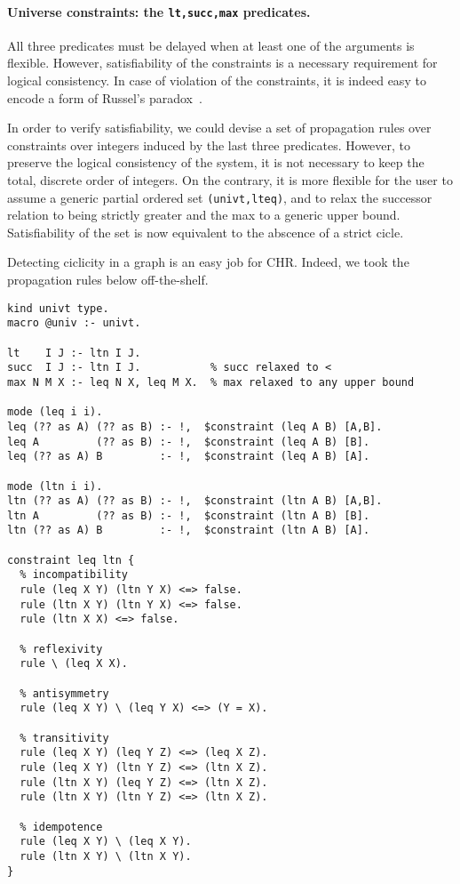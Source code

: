 \documentclass{easychair}
\begin{document}
\paragraph{Universe constraints: the \texttt{lt,succ,max} predicates.}
All three predicates must be delayed when at least one of the arguments is flexible. However, satisfiability of the constraints is a necessary requirement for logical consistency. In case of violation of the constraints, it is indeed easy to encode a form of Russel's paradox~\cite{???}.

In order to verify satisfiability, we could devise a set of propagation rules
over constraints over integers induced by the last three predicates. However, to preserve the logical consistency of the system, it is not necessary to keep the total, discrete order of integers. On the contrary, it is more flexible for the user to assume a generic partial ordered set \verb+(univt,lteq)+, and to relax the successor relation to being strictly greater and the max to a generic upper bound. Satisfiability of the set is now equivalent to the abscence of a strict cicle.

Detecting ciclicity in a graph is an easy job for CHR. Indeed, we took the propagation rules below off-the-shelf.

\begin{verbatim}
kind univt type.
macro @univ :- univt.

lt    I J :- ltn I J.
succ  I J :- ltn I J.           % succ relaxed to <
max N M X :- leq N X, leq M X.  % max relaxed to any upper bound

mode (leq i i).
leq (?? as A) (?? as B) :- !,  $constraint (leq A B) [A,B].
leq A         (?? as B) :- !,  $constraint (leq A B) [B].
leq (?? as A) B         :- !,  $constraint (leq A B) [A].

mode (ltn i i).
ltn (?? as A) (?? as B) :- !,  $constraint (ltn A B) [A,B].
ltn A         (?? as B) :- !,  $constraint (ltn A B) [B].
ltn (?? as A) B         :- !,  $constraint (ltn A B) [A].

constraint leq ltn {
  % incompatibility
  rule (leq X Y) (ltn Y X) <=> false.
  rule (ltn X Y) (ltn Y X) <=> false.
  rule (ltn X X) <=> false.
  
  % reflexivity
  rule \ (leq X X).

  % antisymmetry
  rule (leq X Y) \ (leq Y X) <=> (Y = X).

  % transitivity
  rule (leq X Y) (leq Y Z) <=> (leq X Z).
  rule (leq X Y) (ltn Y Z) <=> (ltn X Z).
  rule (ltn X Y) (leq Y Z) <=> (ltn X Z).
  rule (ltn X Y) (ltn Y Z) <=> (ltn X Z).

  % idempotence
  rule (leq X Y) \ (leq X Y).
  rule (ltn X Y) \ (ltn X Y).
}
\end{verbatim}
\end{document}
